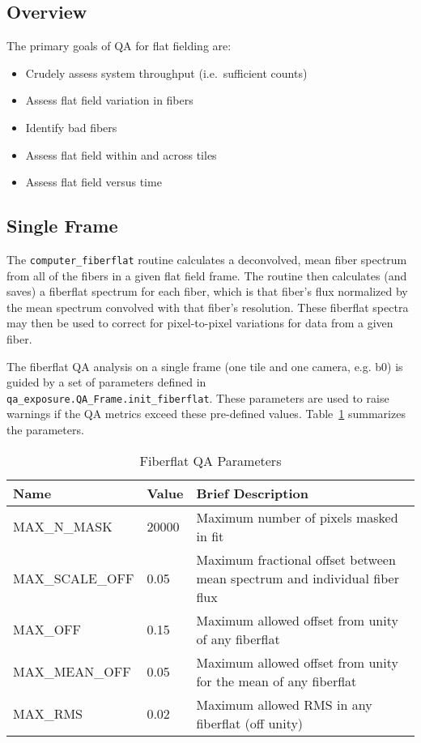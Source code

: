 \documentclass[12pt]{article}
\newenvironment{myitemize}
{ \begin{itemize}
    \setlength{\itemsep}{0pt}
    \setlength{\parskip}{0pt}
    \setlength{\parsep}{0pt}     }
{ \end{itemize}                  }
\begin{document}
\subsection{Overview}

The primary goals of QA for flat fielding are:

\begin{myitemize}
\item Crudely assess system throughput (i.e.\ sufficient counts)
\item Assess flat field variation in fibers
\item Identify bad fibers
\item Assess flat field within and across tiles
\item Assess flat field versus time
\end{myitemize}

\subsection{Single Frame}

The {\tt computer\_fiberflat} routine calculates a 
deconvolved, mean fiber spectrum from all of the fibers in a given 
flat field frame. 
The routine then calculates (and saves) a fiberflat spectrum for each 
fiber, which is that fiber's flux normalized by the mean spectrum 
convolved with that fiber's resolution.  These fiberflat spectra
may then be used to correct for pixel-to-pixel variations 
for data from a given fiber.

The fiberflat QA analysis on a single frame (one tile and one camera, e.g. b0)
is guided by a set of 
parameters defined in {\tt qa\_exposure.QA\_Frame.init\_fiberflat}.
These parameters are used 
to raise warnings if the QA metrics exceed these pre-defined values.
Table~\ref{tab:flat_param} summarizes the parameters.

\begin{table}[h]
\begin{center}
\caption{Fiberflat QA Parameters}
\label{tab:flat_param}
\begin{tabular}{p{3.5cm}p{1.2cm}p{8.3cm}}
\hline
{\bf Name} & {\bf Value} & {\bf Brief Description}\\
\hline
MAX\_N\_MASK    & 20000 & Maximum number of pixels masked in fit \\
MAX\_SCALE\_OFF & 0.05  & Maximum fractional offset between mean spectrum and individual fiber flux \\ 
MAX\_OFF        & 0.15  & Maximum allowed offset from unity of any fiberflat \\
MAX\_MEAN\_OFF  & 0.05  & Maximum allowed offset from unity for the mean of any fiberflat \\
MAX\_RMS        & 0.02  & Maximum allowed RMS in any fiberflat (off unity) \\
\hline
\end{tabular}
\end{center}
\end{table}
\end{document}
